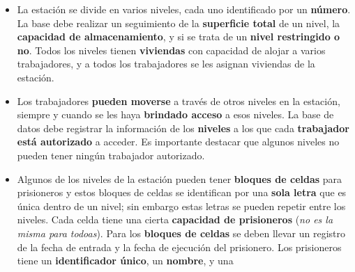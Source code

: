 \documentclass{article}
\begin{document}
\begin{enumerate}[label = (\alph*)]
{\begin{itemize}
{                    trabajo de más de 200,000 trabajadores. Cada trabajador 
                    tiene asignado un \textbf{número de identificación Imperial}
                    , un \textbf{nombre} y \textbf{rango}. Los trabajadores 
                    pueden ser \textbf{oficiales, soldados de asalto, pilotos, 
                    artilleros} o \textbf{personal de apoyo} de la estación. 
                    Todo personal de la estación tiene un \textbf{oficial} al 
                    mando.
                }
                \item {
                    La estación se divide en varios niveles, cada uno 
                    identificado por un \textbf{número}. La base debe realizar
                    un seguimiento de la \textbf{superficie total} de un nivel,
                    la \textbf{capacidad de almacenamiento}, y si se trata de un 
                    \textbf{nivel restringido o no}. Todos los niveles tienen 
                    \textbf{viviendas} con capacidad de alojar a varios 
                    trabajadores, y a todos los trabajadores se les asignan 
                    viviendas de la estación.
                }
                \item {
                    Los trabajadores \textbf{pueden moverse} a través de otros 
                    niveles en la estación, siempre y cuando se les haya 
                    \textbf{brindado acceso} a esos niveles. La base de datos 
                    debe registrar la información de los \textbf{niveles} a los 
                    que cada \textbf{trabajador está autorizado} a acceder. Es 
                    importante destacar que algunos niveles no pueden tener 
                    ningún trabajador autorizado.
                }
                \item {
                    Algunos de los niveles de la estación pueden tener 
                    \textbf{bloques de celdas} para prisioneros y estos bloques
                    de celdas se identifican por una \textbf{sola letra} que es 
                    única dentro de un nivel; sin embargo estas letras se pueden
                    repetir entre los niveles. Cada celda tiene una cierta 
                    \textbf{capacidad de prisioneros} (\textit{no es la misma 
                    para todoas}). Para los \textbf{bloques de celdas} se deben
                    llevar un registro de la fecha de entrada y la fecha de 
                    ejecución del prisionero. Los prisioneros tiene un 
                    \textbf{identificador único}, un \textbf{nombre}, y una 
}
\end{itemize}}
\end{enumerate}
\end{document}
